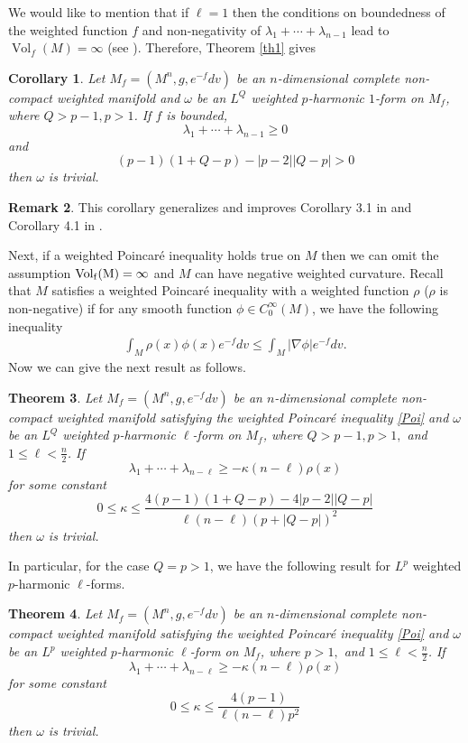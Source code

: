 \documentclass[leqno,12pt]{article} %
\theoremstyle{plain} %
\newtheorem{theorem}{\indent\sc Theorem}[section]
\newtheorem{corollary}[theorem]{\indent\sc Corollary}
\theoremstyle{definition} %
\newtheorem{remark}[theorem]{\indent\sc Remark}
\numberwithin{equation}{section}
\begin{document}
We would like to mention that if $\ell=1$ then the conditions on boundedness of the weighted function $f$ and non-negativity of $\lambda_1+\cdots+\lambda_{n-1}$ lead to $\operatorname{Vol}_f(M)=\infty$ (see \cite{DDH25}). Therefore, Theorem \ref{th1} gives 
\begin{corollary}
	Let $M_f=(M^n,g,e^{-f}dv)$ be an $n$-dimensional complete non-compact weighted manifold  and $\omega$ be an $L^Q$ weighted $p$-harmonic $1$-form on $M_f$, where $Q>p-1,p>1$. 
	If	$f$ is bounded, $$\lambda_1+\cdots+\lambda_{n-1}\ge 0	$$
	and $$(p-1)(1+Q-p)-|p-2||Q-p|>0$$
	then $\omega$ is trivial.
\end{corollary}
\begin{remark}
    This corollary generalizes and improves Corollary 3.1 in \cite{DDH25} and Corollary 4.1 in \cite{VI13}.
\end{remark}
Next, if a weighted Poincar\'e inequality holds true on $M$ then we can omit the assumption $\rm{Vol}_f(M)=\infty$ and $M$ can have negative weighted curvature. Recall that $M$ satisfies a weighted Poincar\'e inequality with a weighted function $\rho$ ($\rho$ is non-negative) if for any smooth function $\phi \in C^{\infty}_0(M)$, we have the following inequality
\begin{align} \label{Poi}
	\int_M \rho(x) \phi(x)e^{-f}dv \le \int_M |\nabla \phi|e^{-f}dv.
\end{align} 
Now we can give the next result as follows.
\begin{theorem}\label{th2}
	Let $M_f=(M^n,g,e^{-f}dv)$ be an $n$-dimensional complete non-compact weighted manifold satisfying the weighted Poincar\'e inequality \eqref{Poi} and $\omega$ be an $L^Q$ weighted $p$-harmonic $\ell$-form on $M_f$, where $Q>p-1,p>1,$ and $1\le \ell < \frac{n}{2}$. 
	If	$$\lambda_1+\cdots+\lambda_{n-\ell}\ge -\kappa(n-\ell)\rho(x)	$$
	for some constant $$0\le \kappa\le \frac{4(p-1)(1+Q-p)-4|p-2||Q-p|}{\ell (n-\ell)(p+|Q-p|)^2}$$
	then $\omega$ is trivial.
\end{theorem}
In particular, for the case $Q=p>1$, we have the following result for $L^p$ weighted $p$-harmonic $\ell$-forms.
\begin{theorem}
	Let $M_f=(M^n,g,e^{-f}dv)$ be an $n$-dimensional complete non-compact weighted manifold satisfying the weighted Poincar\'e inequality \eqref{Poi} and $\omega$ be an $L^p$ weighted $p$-harmonic $\ell$-form on $M_f$, where $p>1,$ and $1\le \ell < \frac{n}{2}$. 
	If	$$\lambda_1+\cdots+\lambda_{n-\ell}\ge -\kappa(n-\ell)\rho(x)	$$
	for some constant $$0\le \kappa\le \frac{4(p-1)}{\ell (n-\ell)p^2}$$
	then $\omega$ is trivial.
\end{theorem}
\end{document}
